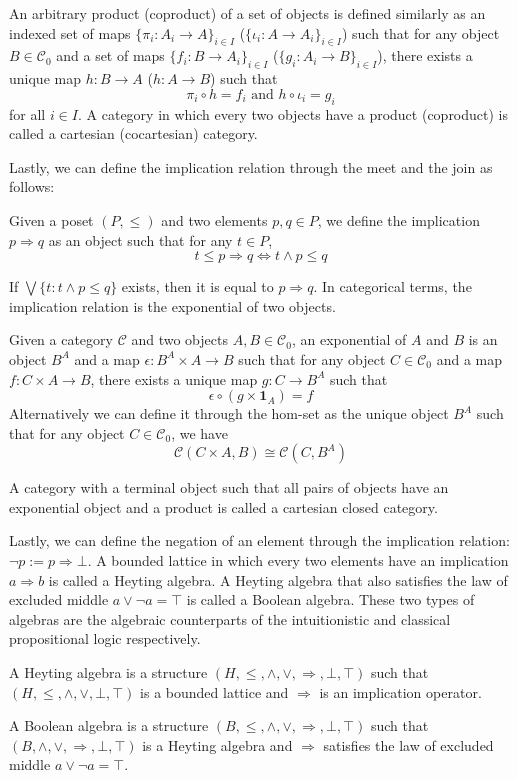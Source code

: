 An arbitrary product (coproduct) of a set of objects is defined similarly as an indexed set of maps
$\{\pi_i:A_i\to A\}_{i\in I}$ ($\{\iota_i:A\to A_i\}_{i\in I}$) such that for any object $B\in\mathcal{C}_0$
and a set of maps $\{f_i:B\to A_i\}_{i\in I}$ ($\{g_i:A_i\to B\}_{i\in I}$), there exists a unique map $h:B\to A$ ($h:A\to B$) such that
\[
    \pi_i\circ h=f_i\text{ and }h\circ \iota_i=g_i
\]
for all $i\in I$.
A category in which every two objects have a product (coproduct) is called a cartesian (cocartesian) category.

Lastly, we can define the implication relation through the meet and the join as follows:
\begin{definition}[Implication]
    Given a poset $(P,\leq)$ and two elements $p,q\in P$, we define the implication $p\Rightarrow q$ as
    an object such that for any $t\in P$,
    \[
        t\leq p\Rightarrow q \iff t\wedge p\leq q
    \]
\end{definition}
If $\bigvee \{t:t\wedge p\leq q\}$ exists, then it is equal to $p\Rightarrow q$.
In categorical terms, the implication relation is the exponential of two objects.
\begin{definition}[Exponential]
    Given a category $\mathcal{C}$ and two objects $A,B\in\mathcal{C}_0$,
    an exponential of $A$ and $B$ is an object $B^A$ and a map $\epsilon:B^A\times A\to B$ such that for any object $C\in\mathcal{C}_0$
    and a map $f:C\times A\to B$, there exists a unique map $g:C\to B^A$ such that
    \[
        \epsilon\circ (g\times \mathbf{1}_A)=f
    \]
    Alternatively we can define it through the hom-set as the unique object $B^A$ such that
    for any object $C\in\mathcal{C}_0$, we have
    \[
        \mathcal{C}(C\times A,B)\cong \mathcal{C}(C,B^A)
    \]
\end{definition}
A category with a terminal object such that
all pairs of objects have an exponential object and a product is called a cartesian closed category.

Lastly, we can define the negation of an element through the implication relation:
$\neg p:=p\Rightarrow \bot$.
A bounded lattice in which every two elements have an implication $a\Rightarrow b$ is called a Heyting algebra.
A Heyting algebra that also satisfies the law of excluded middle $a\vee \neg a=\top$ is called a Boolean algebra.
These two types of algebras are the algebraic counterparts of the intuitionistic and classical propositional logic respectively.
\begin{definition}
    A Heyting algebra is a structure $(H,\leq,\wedge,\vee,\Rightarrow,\bot,\top)$ such that
    $(H,\leq,\wedge,\vee,\bot,\top)$ is a bounded lattice
    and $\Rightarrow$ is an implication operator.

    A Boolean algebra is a structure $(B,\leq,\wedge,\vee,\Rightarrow,\bot,\top)$ such that
    $(B,\wedge,\vee,\Rightarrow,\bot,\top)$ is a Heyting algebra
    and $\Rightarrow$ satisfies the law of excluded middle $a\vee \neg a=\top$.
\end{definition}

